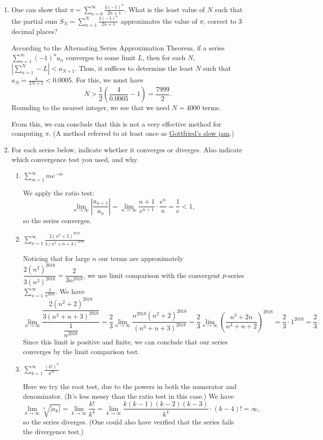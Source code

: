 \documentclass[12pt]{article}
\newcommand{\di}{\displaystyle}
\newcommand{\abs}[1]{\left\lvert #1\right\rvert}
\begin{document}
\begin{enumerate}
\item One can show that $\di \pi = \sum_{n=0}^\infty \frac{4(-1)^n}{2n+1}$. What is the least value of $N$ such that the partial sum $\di S_N=\sum_{n=1}^N \frac{4(-1)^n}{2n+1}$ approximates the value of $\pi$, correct to 3 decimal places?

According to the Alternating Series Approximation Theorem, if a series $\sum_{n=1}^\infty (-1)^na_n$ converges to some limit $L$, then for each $N$, $\di\abs{\sum_{n=1}^N-L}<a_{N+1}$. Thus, it suffices to determine the least $N$ such that $a_N = \frac{4}{2N+1} < 0.0005$. For this, we must have
\[
N>\frac12\left(\frac{4}{0.0005}-1\right)= \frac{7999}{2}.
\]
Rounding to the nearest integer, we see that we need $N=4000$ terms. 

From this, we can conclude that this is not a very effective method for computing $\pi$. (A method referred to at least once as \href{https://mathwithbaddrawings.com/2016/03/14/the-pi-day-recipe-book/}{Gottfried's slow jam}.)


\item For each series below, indicate whether it converges or diverges. Also indicate which convergence test you used, and why.
\begin{enumerate}
\item $\di \sum_{m=1}^\infty me^{-m}$

We apply the ratio test:
\[
\lim_{n\to\infty}\abs{\frac{a_{n+1}}{a_n}}=\lim_{n\to\infty}\frac{n+1}{e^{n+1}}\cdot \frac{e^n}{n} = \frac{1}{e}<1,
\]
so the series converges.

\item $\di \sum_{n=1}^\infty \frac{2(n^2+2)^{2018}}{3(n^3+n+3)^{2018}}$

Noticing that for large $n$ our terms are approximately $\dfrac{2(n^2)^{2018}}{3(n^3)^{2018}}=\dfrac{2}{3n^{2018}}$, we use limit comparison with the convergent $p$-series $\di\sum_{n=1}^\infty\frac{1}{n^{2018}}$. We have
\[
\lim_{n\to\infty}\frac{\dfrac{2(n^2+2)^{2018}}{3(n^3+n+3)^{2018}}}{\dfrac{1}{n^{2018}}}=\frac23 \lim_{n\to\infty}\frac{n^{2018}(n^2+2)^{2018}}{(n^3+n+3)^{2018}} =\frac23\lim_{n\to\infty}\left(\frac{n^3+2n}{n^3+n+2}\right)^{2018}=\frac23\cdot 1^{2018}=\frac23.
\]
Since this limit is positive and finite, we can conclude that our series converges by the limit comparison test.


\item $\di \sum_{k=1}^\infty \frac{(k!)^k}{k^{4k}}$

Here we try the root test, due to the powers in both the numerator and denominator. (It's less messy than the ratio test in this case.) We have
\[
\lim_{k\to\infty}\sqrt[k]{\abs{a_k}} = \lim_{k\to\infty}\frac{k!}{k^4}=\lim_{k\to\infty}\frac{k(k-1)(k-2)(k-3)}{k^4}\cdot (k-4)! = \infty,
\]
so the series diverges. (One could also have verified that the series fails the divergence test.)
\end{enumerate}
\end{enumerate}
\end{document}

